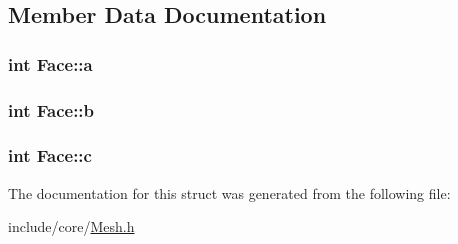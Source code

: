 \subsection{Member Data Documentation}
\hypertarget{structFace_ad22c1f9df64e0ab7301e3349840d374c}{
\subsubsection[{a}]{\setlength{\rightskip}{0pt plus 5cm}int Face\-::a}}\label{structFace_ad22c1f9df64e0ab7301e3349840d374c}
\hypertarget{structFace_a7d790e4ef4951ecc9accf3112ca9b8ca}{
\subsubsection[{b}]{\setlength{\rightskip}{0pt plus 5cm}int Face\-::b}}\label{structFace_a7d790e4ef4951ecc9accf3112ca9b8ca}
\hypertarget{structFace_ada48793aa5b976dd136ace168499f624}{
\subsubsection[{c}]{\setlength{\rightskip}{0pt plus 5cm}int Face\-::c}}\label{structFace_ada48793aa5b976dd136ace168499f624}


The documentation for this struct was generated from the following file\-:\begin{DoxyCompactItemize}
\item 
include/core/\hyperlink{Mesh_8h}{Mesh.\-h}\end{DoxyCompactItemize}
